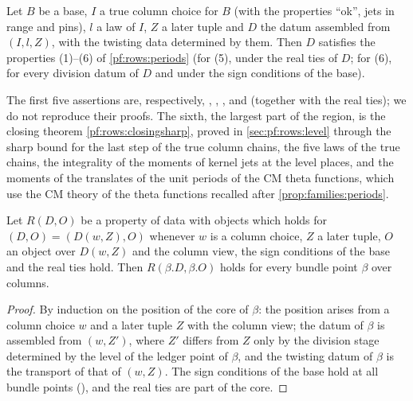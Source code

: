 \begin{lemma}\label{pf:rows:closing}
Let $B$ be a base, $I$ a true column choice for $B$ (with the properties ``ok'', jets in range and pins), $l$ a law of
$I$, $Z$ a later tuple and $D$ the datum assembled from $(I,l,Z)$, with the twisting data determined by them. Then $D$
satisfies the properties (1)--(6) of \cref{pf:rows:periods} (for (5), under the real ties of $D$; for (6), for every
division datum of $D$ and under the sign conditions of the base).
\end{lemma}

The first five assertions are, respectively, ,
, ,
 and
 (together with the real ties); we do not
reproduce their proofs. The sixth, the largest part of the region, is the closing theorem \cref{pf:rows:closingsharp}, proved in
\cref{sec:pf:rows:level} through the sharp bound for the last step of the true column chains, the five laws of the true chains,
the integrality of the moments of kernel jets at the level places, and the moments of the translates of the unit periods of the
CM theta functions, which use the CM theory of the theta functions recalled after \cref{prop:families:periods}.

\begin{lemma}\label{pf:rows:view}
Let $R(D,O)$ be a property of data with objects which holds for $(D,O)=(D(w,Z),O)$ whenever $w$ is a column choice, $Z$
a later tuple, $O$ an object over $D(w,Z)$ and the column view, the sign conditions of the base and the real ties hold.
Then $R(\beta.D,\beta.O)$ holds for every bundle point $\beta$ over columns.
\end{lemma}

\begin{proof}
By induction on the position of the core of $\beta$: the position arises from a column choice $w$ and a later tuple $Z$
with the column view; the datum of $\beta$ is assembled from $(w,Z')$, where $Z'$ differs from $Z$ only by the division
stage determined by the level of the ledger point of $\beta$, and the twisting datum of $\beta$ is the transport of that of
$(w,Z)$. The sign conditions of the base hold at all bundle points
(), and the real ties are part of the core.
\end{proof}

